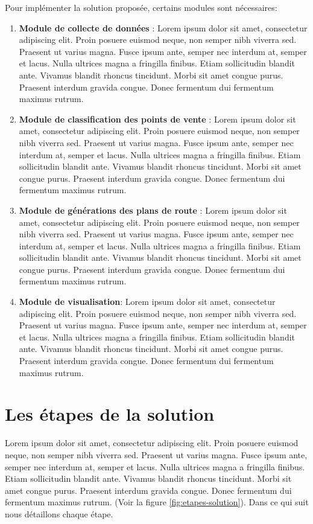 Pour implémenter la solution proposée, certains modules sont nécessaires:
\begin{enumerate}
    \item \textbf{Module de collecte de données} : Lorem ipsum dolor sit amet, consectetur adipiscing elit. Proin posuere euismod neque, non semper nibh viverra sed. Praesent ut varius magna. Fusce ipsum ante, semper nec interdum at, semper et lacus. Nulla ultrices magna a fringilla finibus. Etiam sollicitudin blandit ante. Vivamus blandit rhoncus tincidunt. Morbi sit amet congue purus. Praesent interdum gravida congue. Donec fermentum dui fermentum maximus rutrum. 
    \item \textbf{Module de classification des points de vente} : Lorem ipsum dolor sit amet, consectetur adipiscing elit. Proin posuere euismod neque, non semper nibh viverra sed. Praesent ut varius magna. Fusce ipsum ante, semper nec interdum at, semper et lacus. Nulla ultrices magna a fringilla finibus. Etiam sollicitudin blandit ante. Vivamus blandit rhoncus tincidunt. Morbi sit amet congue purus. Praesent interdum gravida congue. Donec fermentum dui fermentum maximus rutrum.
    \item \textbf{Module de générations des plans de route} : Lorem ipsum dolor sit amet, consectetur adipiscing elit. Proin posuere euismod neque, non semper nibh viverra sed. Praesent ut varius magna. Fusce ipsum ante, semper nec interdum at, semper et lacus. Nulla ultrices magna a fringilla finibus. Etiam sollicitudin blandit ante. Vivamus blandit rhoncus tincidunt. Morbi sit amet congue purus. Praesent interdum gravida congue. Donec fermentum dui fermentum maximus rutrum.
    \item \textbf{Module de visualisation}: Lorem ipsum dolor sit amet, consectetur adipiscing elit. Proin posuere euismod neque, non semper nibh viverra sed. Praesent ut varius magna. Fusce ipsum ante, semper nec interdum at, semper et lacus. Nulla ultrices magna a fringilla finibus. Etiam sollicitudin blandit ante. Vivamus blandit rhoncus tincidunt. Morbi sit amet congue purus. Praesent interdum gravida congue. Donec fermentum dui fermentum maximus rutrum.
\end{enumerate}






\section{Les étapes de la solution}
Lorem ipsum dolor sit amet, consectetur adipiscing elit. Proin posuere euismod neque, non semper nibh viverra sed. Praesent ut varius magna. Fusce ipsum ante, semper nec interdum at, semper et lacus. Nulla ultrices magna a fringilla finibus. Etiam sollicitudin blandit ante. Vivamus blandit rhoncus tincidunt. Morbi sit amet congue purus. Praesent interdum gravida congue. Donec fermentum dui fermentum maximus rutrum. (Voir la figure \ref{fig:etapes-solution}). Dans ce qui suit nous détaillons chaque étape.


